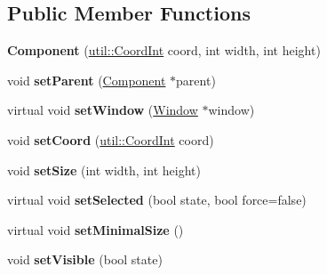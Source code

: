 \subsection*{Public Member Functions}
\begin{DoxyCompactItemize}
\item 
\hypertarget{classgraphics_1_1_component_a7cb8f368da1da6df067c2d9faf4ee8eb}{{\bfseries Component} (\hyperlink{classutil_1_1_coordinates}{util\-::\-Coord\-Int} coord, int width, int height)}\label{classgraphics_1_1_component_a7cb8f368da1da6df067c2d9faf4ee8eb}

\item 
\hypertarget{classgraphics_1_1_component_a62456cc93c351f3ed7757687346c0899}{void {\bfseries set\-Parent} (\hyperlink{classgraphics_1_1_component}{Component} $\ast$parent)}\label{classgraphics_1_1_component_a62456cc93c351f3ed7757687346c0899}

\item 
\hypertarget{classgraphics_1_1_component_a5b45fe24657f9c7d687c5e20dd2e09f5}{virtual void {\bfseries set\-Window} (\hyperlink{classgraphics_1_1_window}{Window} $\ast$window)}\label{classgraphics_1_1_component_a5b45fe24657f9c7d687c5e20dd2e09f5}

\item 
\hypertarget{classgraphics_1_1_component_a271f8c35dde5d9fcde16dc29b66f7863}{void {\bfseries set\-Coord} (\hyperlink{classutil_1_1_coordinates}{util\-::\-Coord\-Int} coord)}\label{classgraphics_1_1_component_a271f8c35dde5d9fcde16dc29b66f7863}

\item 
\hypertarget{classgraphics_1_1_component_a5001371036a53bf8f6580f697146a12c}{void {\bfseries set\-Size} (int width, int height)}\label{classgraphics_1_1_component_a5001371036a53bf8f6580f697146a12c}

\item 
\hypertarget{classgraphics_1_1_component_a5231a7bfce7f22fa93a9673b30969951}{virtual void {\bfseries set\-Selected} (bool state, bool force=false)}\label{classgraphics_1_1_component_a5231a7bfce7f22fa93a9673b30969951}

\item 
\hypertarget{classgraphics_1_1_component_a9193e8b54f138743a1f912e5cd225b64}{virtual void {\bfseries set\-Minimal\-Size} ()}\label{classgraphics_1_1_component_a9193e8b54f138743a1f912e5cd225b64}

\item 
\hypertarget{classgraphics_1_1_component_a054a9c5a923c32d23525c7889b36bdc5}{void {\bfseries set\-Visible} (bool state)}\label{classgraphics_1_1_component_a054a9c5a923c32d23525c7889b36bdc5}


\end{DoxyCompactItemize}
